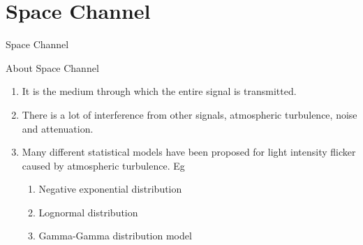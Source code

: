 \documentclass{beamer}
\begin{document}
\section{Space Channel}
\begin{frame}{Space Channel}
\begin{block}{About Space Channel}
\begin{enumerate}
    \item It is the medium through which the entire signal is transmitted.
    \item There is a lot of interference from other signals, atmospheric turbulence, noise and attenuation.
    \item Many different statistical models have been proposed for light intensity flicker caused by atmospheric turbulence. Eg\begin{enumerate}
        \item Negative exponential distribution
        \item Lognormal distribution
        \item Gamma-Gamma distribution model
    \end{enumerate}
\end{enumerate}
\end{block}
\end{frame}
\end{document}
